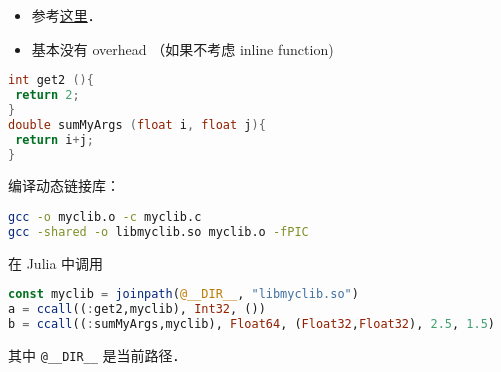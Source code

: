 
\begin{issues}
\issueDraft
\end{issues}

\begin{itemize}
\item 参考\href{https://docs.julialang.org/en/v1/manual/calling-c-and-fortran-code/}{这里}．
\item 基本没有 overhead （如果不考虑 inline function)
\end{itemize}

\begin{lstlisting}[language=cpp]
int get2 (){
 return 2;
}
double sumMyArgs (float i, float j){
 return i+j;
}
\end{lstlisting}

编译动态链接库：
\begin{lstlisting}[language=bash]
gcc -o myclib.o -c myclib.c
gcc -shared -o libmyclib.so myclib.o -fPIC
\end{lstlisting}

在 Julia 中调用
\begin{lstlisting}[language=julia]
const myclib = joinpath(@__DIR__, "libmyclib.so")
a = ccall((:get2,myclib), Int32, ())
b = ccall((:sumMyArgs,myclib), Float64, (Float32,Float32), 2.5, 1.5)
\end{lstlisting}
其中 \verb|@__DIR__| 是当前路径．
